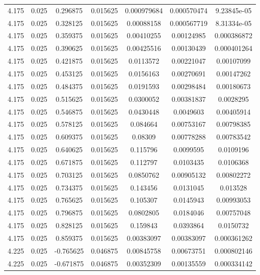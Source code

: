 \begin{table}[bh]
\begin{center}
{\begin{tabular}{ccccccc}
4.175	 & 0.025 & 	0.296875	 & 0.015625	 & 0.000979684	 & 0.000570474	 & 9.23845e-05 \\ 
4.175	 & 0.025 & 	0.328125	 & 0.015625	 & 0.00088158	 & 0.000567719	 & 8.31334e-05 \\ 
4.175	 & 0.025 & 	0.359375	 & 0.015625	 & 0.00410255	 & 0.00124985	 & 0.000386872 \\ 
4.175	 & 0.025 & 	0.390625	 & 0.015625	 & 0.00425516	 & 0.00130439	 & 0.000401264 \\ 
4.175	 & 0.025 & 	0.421875	 & 0.015625	 & 0.0113572	 & 0.00221047	 & 0.00107099 \\ 
4.175	 & 0.025 & 	0.453125	 & 0.015625	 & 0.0156163	 & 0.00270691	 & 0.00147262 \\ 
4.175	 & 0.025 & 	0.484375	 & 0.015625	 & 0.0191593	 & 0.00298484	 & 0.00180673 \\ 
4.175	 & 0.025 & 	0.515625	 & 0.015625	 & 0.0300052	 & 0.00381837	 & 0.0028295 \\ 
4.175	 & 0.025 & 	0.546875	 & 0.015625	 & 0.0430448	 & 0.0049603	 & 0.00405914 \\ 
4.175	 & 0.025 & 	0.578125	 & 0.015625	 & 0.084664	 & 0.00753167	 & 0.00798385 \\ 
4.175	 & 0.025 & 	0.609375	 & 0.015625	 & 0.08309	 & 0.00778288	 & 0.00783542 \\ 
4.175	 & 0.025 & 	0.640625	 & 0.015625	 & 0.115796	 & 0.0099595	 & 0.0109196 \\ 
4.175	 & 0.025 & 	0.671875	 & 0.015625	 & 0.112797	 & 0.0103435	 & 0.0106368 \\ 
4.175	 & 0.025 & 	0.703125	 & 0.015625	 & 0.0850762	 & 0.00905132	 & 0.00802272 \\ 
4.175	 & 0.025 & 	0.734375	 & 0.015625	 & 0.143456	 & 0.0131045	 & 0.013528 \\ 
4.175	 & 0.025 & 	0.765625	 & 0.015625	 & 0.105307	 & 0.0145943	 & 0.00993053 \\ 
4.175	 & 0.025 & 	0.796875	 & 0.015625	 & 0.0802805	 & 0.0184046	 & 0.00757048 \\ 
4.175	 & 0.025 & 	0.828125	 & 0.015625	 & 0.159843	 & 0.0393864	 & 0.0150732 \\ 
4.175	 & 0.025 & 	0.859375	 & 0.015625	 & 0.00383097	 & 0.00383097	 & 0.000361262 \\ 
4.225	 & 0.025 & 	-0.765625	 & 0.046875	 & 0.00845758	 & 0.00673751	 & 0.000802146 \\ 
4.225	 & 0.025 & 	-0.671875	 & 0.046875	 & 0.00352309	 & 0.00135559	 & 0.000334142 \\ 

\end{tabular}}
\end{center}
\end{table}
